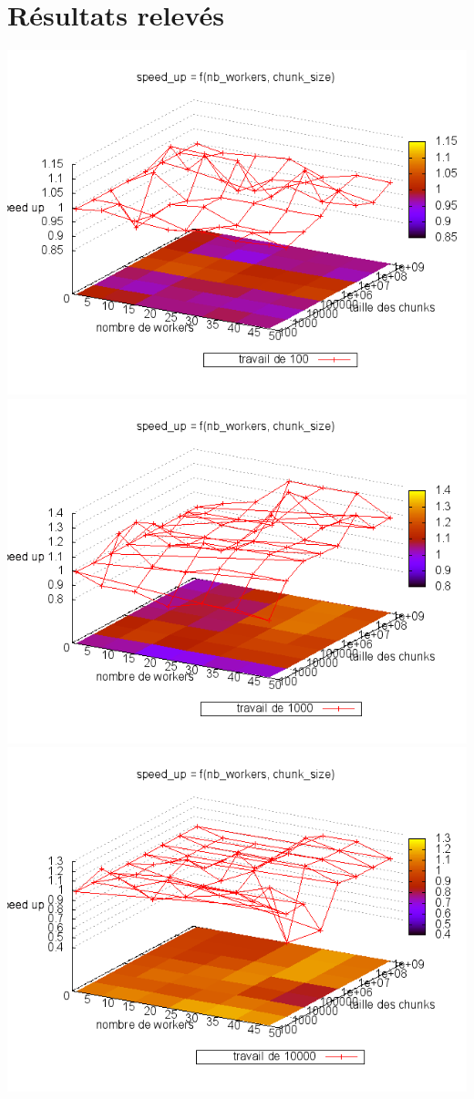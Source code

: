 \documentclass[oneside,10pt]{article}
\begin{document}
\section{R\'esultats relev\'es}
\includegraphics[scale=0.5]{travail_100.png}
\includegraphics[scale=0.5]{travail_1000.png}
\includegraphics[scale=0.5]{travail_10000.png}
\end{document}

